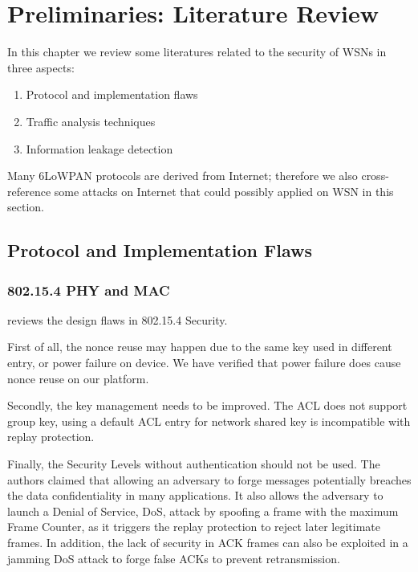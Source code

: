 \chapter{Preliminaries: Literature Review} \label{Chp: Literature Review}

In this chapter we review some literatures related to the security of WSNs in three aspects:
\begin{enumerate}
	\item Protocol and implementation flaws
	\item Traffic analysis techniques
	\item Information leakage detection
\end{enumerate}

Many 6LoWPAN protocols are derived from Internet; therefore we also cross-reference some attacks on Internet that could  possibly applied on WSN in this section.

\section{Protocol and Implementation Flaws}

\subsection{802.15.4 PHY and MAC} \label{Subsec: 802154 Sec Issue}

\cite{802154sec} reviews the design flaws in 802.15.4 Security. 

First of all, the nonce reuse may happen due to the same key used in different entry, or power failure on device. We have verified that power failure does cause nonce reuse on our platform.

Secondly, the key management needs to be improved. The ACL does not support group key, using a default ACL entry for network shared key is incompatible with replay protection. 

Finally, the Security Levels without authentication should not be used. The authors claimed that allowing an adversary to forge messages potentially breaches the data confidentiality in many applications. It also allows the adversary to launch a Denial of Service, DoS, attack by spoofing a frame with the maximum Frame Counter, as it triggers the replay protection to reject later legitimate frames. In addition, the lack of security in ACK frames can also be exploited in a jamming DoS attack to forge false ACKs to prevent retransmission.

